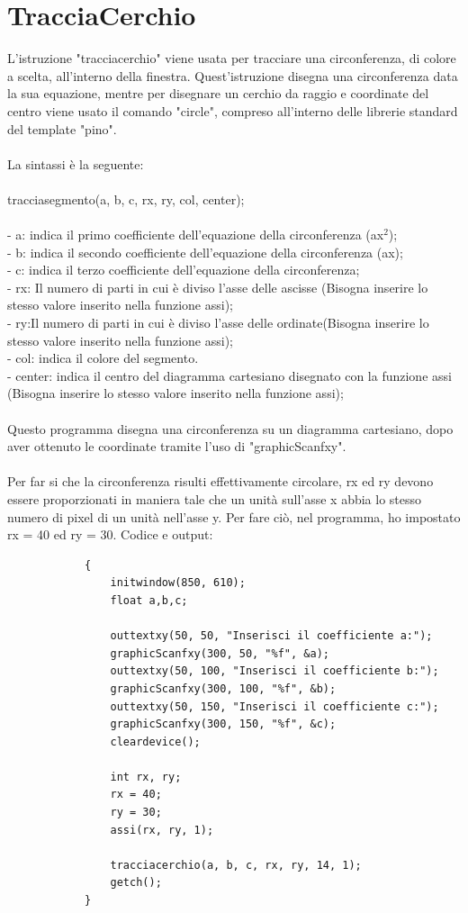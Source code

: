 \documentclass[12pt]{book}
\begin{document}
		\section{TracciaCerchio}
			L'istruzione "tracciacerchio" viene usata per tracciare una circonferenza, di colore a scelta, all'interno della finestra.
			Quest'istruzione disegna una circonferenza data la sua equazione, mentre per disegnare un cerchio da raggio e coordinate del centro viene usato il comando "circle", compreso all'interno delle librerie standard del template "pino".
			\\
		\\La sintassi è la seguente:
		\\
		\\
		\Large tracciasegmento(a, b, c, rx, ry, col, center);
		\normalsize
		\\
		\\- a: indica il primo coefficiente dell'equazione della circonferenza (ax$^2$);
		\\- b: indica il secondo coefficiente dell'equazione della circonferenza (ax);
		\\- c: indica il terzo coefficiente dell'equazione della circonferenza; 
		\\- rx: Il numero di parti in cui è diviso l'asse delle ascisse (Bisogna inserire lo stesso valore inserito nella funzione assi);
		\\- ry:Il numero di parti in cui è diviso l'asse delle ordinate(Bisogna inserire lo stesso valore inserito nella funzione assi);
		\\- col: indica il colore del segmento.
		\\- center: indica il centro del diagramma cartesiano disegnato con la funzione assi (Bisogna inserire lo stesso valore inserito nella funzione assi);
		\\
		\\
		Questo programma disegna una circonferenza su un diagramma cartesiano, dopo aver ottenuto le coordinate tramite l'uso di "graphicScanfxy".
		\\\\Per far si che la circonferenza risulti effettivamente circolare, rx ed ry devono essere proporzionati in maniera tale che un unità sull'asse x abbia lo stesso numero di pixel di un unità nell'asse y. Per fare ciò, nel programma, ho impostato rx = 40 ed ry = 30. 
		\newpage
		Codice e output:			
		\begin{lstlisting}
			{
				initwindow(850, 610);
				float a,b,c;
				
				outtextxy(50, 50, "Inserisci il coefficiente a:");
				graphicScanfxy(300, 50, "%f", &a);
				outtextxy(50, 100, "Inserisci il coefficiente b:");
				graphicScanfxy(300, 100, "%f", &b);
				outtextxy(50, 150, "Inserisci il coefficiente c:");
				graphicScanfxy(300, 150, "%f", &c);
				cleardevice();
				
				int rx, ry;
				rx = 40;
				ry = 30;
				assi(rx, ry, 1);
				
				tracciacerchio(a, b, c, rx, ry, 14, 1);
				getch();
			}
		\end{lstlisting}
		
\end{document}
